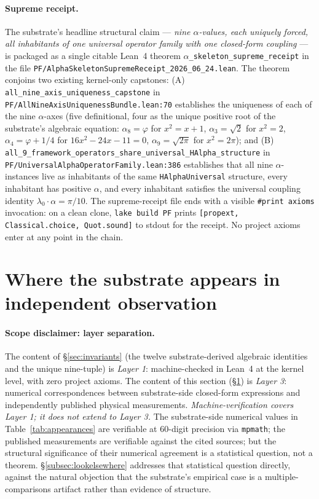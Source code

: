 \documentclass[11pt,a4paper]{amsart}
\theoremstyle{plain}
\theoremstyle{definition}
\begin{document}
\paragraph{Supreme receipt.} The substrate's headline structural claim --- \emph{nine $\alpha$-values, each uniquely forced, all inhabitants of one universal operator family with one closed-form coupling} --- is packaged as a single citable Lean~4 theorem \texttt{$\alpha$\_skeleton\_supreme\_receipt} in the file \texttt{PF/AlphaSkeletonSupremeReceipt\_2026\_06\_24.lean}. The theorem conjoins two existing kernel-only capstones: (A) \texttt{all\_nine\_axis\_uniqueness\_capstone} in \texttt{PF/AllNineAxisUniquenessBundle.lean:70} establishes the uniqueness of each of the nine $\alpha$-axes (five definitional, four as the unique positive root of the substrate's algebraic equation: $\alpha_8=\varphi$ for $x^2=x+1$, $\alpha_3=\sqrt{2}$ for $x^2=2$, $\alpha_4=\varphi+1/4$ for $16x^2-24x-11=0$, $\alpha_9=\sqrt{2\pi}$ for $x^2=2\pi$); and (B) \texttt{all\_9\_framework\_operators\_share\_universal\_HAlpha\_structure} in \texttt{PF/UniversalAlphaOperatorFamily.lean:386} establishes that all nine $\alpha$-instances live as inhabitants of the same \texttt{HAlphaUniversal} structure, every inhabitant has positive $\alpha$, and every inhabitant satisfies the universal coupling identity $\lambda_0 \cdot \alpha = \pi/10$. The supreme-receipt file ends with a visible \texttt{\#print axioms} invocation: on a clean clone, \texttt{lake build PF} prints \texttt{[propext, Classical.choice, Quot.sound]} to stdout for the receipt. No project axioms enter at any point in the chain.

\section{Where the substrate appears in independent observation}\label{sec:corroborations}

\paragraph{Scope disclaimer: layer separation.} The content of \S\ref{sec:invariants} (the twelve substrate-derived algebraic identities and the unique nine-tuple) is \emph{Layer 1}: machine-checked in Lean~4 at the kernel level, with zero project axioms. The content of this section (\S\ref{sec:corroborations}) is \emph{Layer 3}: numerical correspondences between substrate-side closed-form expressions and independently published physical measurements. \emph{Machine-verification covers Layer 1; it does not extend to Layer 3.} The substrate-side numerical values in Table~\ref{tab:appearances} are verifiable at 60-digit precision via \texttt{mpmath}; the published measurements are verifiable against the cited sources; but the structural significance of their numerical agreement is a statistical question, not a theorem. \S\ref{subsec:lookelsewhere} addresses that statistical question directly, against the natural objection that the substrate's empirical case is a multiple-comparisons artifact rather than evidence of structure.
\end{document}

